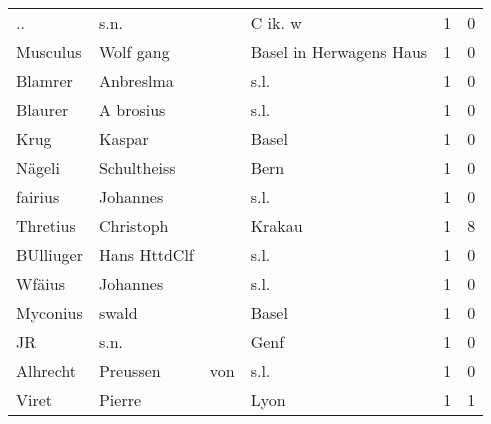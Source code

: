 \begin{tabular}{llllrr}
                       .. &                               s.n. &             &                                     C ik. w &          1 &         0 \\
                 Musculus &                          Wolf gang &             &                     Basel in Herwagens Haus &          1 &         0 \\
                  Blamrer &                          Anbreslma &             &                                        s.l. &          1 &         0 \\
                  Blaurer &                          A brosius &             &                                        s.l. &          1 &         0 \\
                     Krug &                             Kaspar &             &                                       Basel &          1 &         0 \\
                   Nägeli &                        Schultheiss &             &                                        Bern &          1 &         0 \\
                  fairius &                           Johannes &             &                                        s.l. &          1 &         0 \\
                 Thretius &                          Christoph &             &                                      Krakau &          1 &         8 \\
                BUlliuger &                       Hans HttdClf &             &                                        s.l. &          1 &         0 \\
                   Wfäius &                           Johannes &             &                                        s.l. &          1 &         0 \\
                 Myconius &                              swald &             &                                       Basel &          1 &         0 \\
                       JR &                               s.n. &             &                                        Genf &          1 &         0 \\
                 Alhrecht &                           Preussen &         von &                                        s.l. &          1 &         0 \\
                    Viret &                             Pierre &             &                                        Lyon &          1 &         1 \\

\end{tabular}
